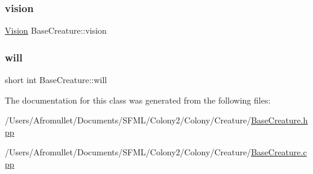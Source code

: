 \subsubsection{\texorpdfstring{vision}{vision}}
{\footnotesize\ttfamily \mbox{\hyperlink{class_vision}{Vision}} Base\+Creature\+::vision\hspace{0.3cm}{\ttfamily [private]}}

\mbox{\label{class_base_creature_a992cbd3a6be93279f2c933a50eba5000}} 
\subsubsection{\texorpdfstring{will}{will}}
{\footnotesize\ttfamily short int Base\+Creature\+::will\hspace{0.3cm}{\ttfamily [private]}}



The documentation for this class was generated from the following files\+:\begin{DoxyCompactItemize}
\item 
/\+Users/\+Afromullet/\+Documents/\+S\+F\+M\+L/\+Colony2/\+Colony/\+Creature/\mbox{\hyperlink{_base_creature_8hpp}{Base\+Creature.\+hpp}}\item 
/\+Users/\+Afromullet/\+Documents/\+S\+F\+M\+L/\+Colony2/\+Colony/\+Creature/\mbox{\hyperlink{_base_creature_8cpp}{Base\+Creature.\+cpp}}\end{DoxyCompactItemize}
